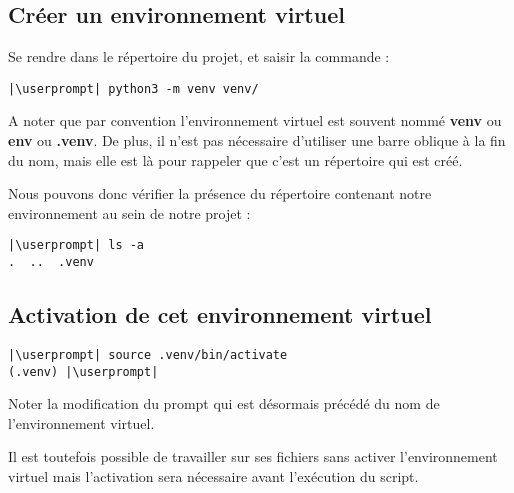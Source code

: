\subsection*{Créer un environnement virtuel}
Se rendre dans le répertoire du projet, et saisir la commande :
\begin{lstlisting}[style=bash]
|\userprompt| python3 -m venv venv/
\end{lstlisting}

A noter que par convention l'environnement virtuel est souvent nommé \textbf{venv} ou \textbf{env} ou \textbf{.venv}. De plus, il n'est pas nécessaire d'utiliser une barre oblique à la fin du nom, mais elle est là pour rappeler que c'est un répertoire qui est créé.

Nous pouvons donc vérifier la présence du répertoire contenant notre environnement au sein de notre projet :
\begin{lstlisting}[style=bash]
|\userprompt| ls -a
.  ..  .venv
\end{lstlisting}

\subsection*{Activation de cet environnement virtuel}
\begin{lstlisting}[style=bash]
|\userprompt| source .venv/bin/activate
(.venv) |\userprompt|
\end{lstlisting}

Noter la modification du prompt qui est désormais précédé du nom de l'environnement virtuel.

Il est toutefois possible de travailler sur ses fichiers sans activer l'environnement virtuel mais l'activation sera nécessaire avant l'exécution du script.

